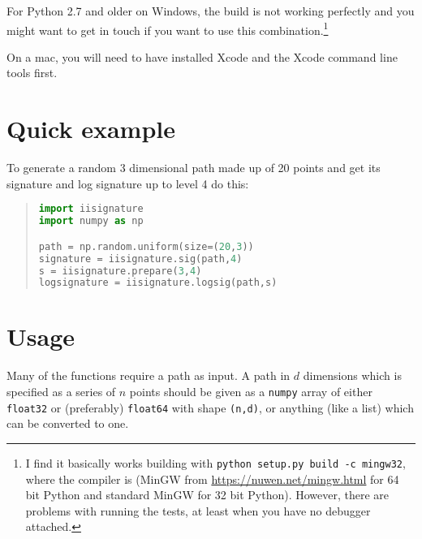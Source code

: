 \documentclass[a4paper]{extarticle}
\begin{document}
For Python 2.7 and older on Windows, the build is not working perfectly and you might want to get in touch if you want to use this combination.\footnote{I find it basically works building with \texttt{python setup.py build -c mingw32}, where the compiler is (MinGW from \url{https://nuwen.net/mingw.html} for 64 bit Python and standard MinGW for 32 bit Python). However, there are problems with running the tests, at least when you have no debugger attached. }

On a mac, you will need to have installed Xcode and the Xcode command line tools first. %

\newpage
\section{Quick example}
To generate a random 3 dimensional path made up of 20 points and get its signature and log signature up to level 4 do this:
\begin{quotation}
\begin{lstlisting}[frame=single,language=Python,keywordstyle=\bf]
import iisignature
import numpy as np

path = np.random.uniform(size=(20,3))
signature = iisignature.sig(path,4)
s = iisignature.prepare(3,4)
logsignature = iisignature.logsig(path,s)
\end{lstlisting}
\end{quotation}
\section{Usage}

Many of the functions require a path as input. A path in $d$ dimensions which is specified as a series of $n$ points should be given as a \verb|numpy| array of either \verb|float32| or (preferably) \verb|float64| with shape \verb|(n,d)|, or anything (like a list) which can be converted to one.
\end{document}

